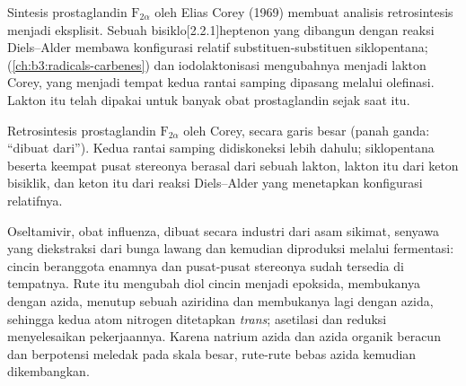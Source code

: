 Sintesis prostaglandin $\mathrm F_{2\alpha}$ oleh Elias Corey (1969) membuat analisis retrosintesis
menjadi eksplisit. Sebuah bisiklo[2.2.1]heptenon yang dibangun dengan reaksi Diels--Alder membawa
konfigurasi relatif substituen-substituen siklopentana;  (\cref{ch:b3:radicals-carbenes}) dan
iodolaktonisasi mengubahnya menjadi lakton Corey, yang menjadi tempat kedua rantai samping
dipasang melalui olefinasi. Lakton itu telah dipakai untuk banyak obat prostaglandin
sejak saat itu.

\begin{omfigure}

{\small Retrosintesis prostaglandin $\mathrm F_{2\alpha}$ oleh Corey, secara garis besar (panah ganda: ``dibuat
dari''). Kedua rantai samping didiskoneksi lebih dahulu; siklopentana beserta
keempat pusat stereonya berasal dari sebuah lakton, lakton itu dari keton bisiklik,
dan keton itu dari reaksi Diels--Alder yang menetapkan konfigurasi relatifnya.}
\end{omfigure}

Oseltamivir, obat influenza, dibuat secara industri dari asam sikimat, senyawa
 yang diekstraksi dari bunga lawang dan kemudian diproduksi melalui
fermentasi: cincin beranggota enamnya dan pusat-pusat stereonya sudah tersedia di tempatnya.
Rute itu mengubah diol cincin menjadi epoksida, membukanya dengan azida, menutup
sebuah aziridina dan membukanya lagi dengan azida, sehingga kedua atom nitrogen ditetapkan
\textit{trans}; asetilasi dan reduksi menyelesaikan pekerjaannya. Karena natrium azida dan
azida organik beracun dan berpotensi meledak pada skala besar, rute-rute bebas azida
kemudian dikembangkan.

